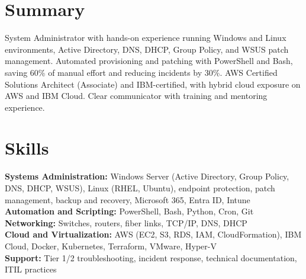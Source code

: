 \documentclass[a4paper,10pt]{article}
\begin{document}

\section*{Summary}
System Administrator with hands-on experience running Windows and Linux environments, Active Directory, DNS, DHCP, Group Policy, and WSUS patch management. Automated provisioning and patching with PowerShell and Bash, saving 60\% of manual effort and reducing incidents by 30\%. AWS Certified Solutions Architect (Associate) and IBM-certified, with hybrid cloud exposure on AWS and IBM Cloud. Clear communicator with training and mentoring experience.

\section*{Skills}
\textbf{Systems Administration:} Windows Server (Active Directory, Group Policy, DNS, DHCP, WSUS), Linux (RHEL, Ubuntu), endpoint protection, patch management, backup and recovery, Microsoft 365, Entra ID, Intune \\
\textbf{Automation and Scripting:} PowerShell, Bash, Python, Cron, Git\\
\textbf{Networking:} Switches, routers, fiber links, TCP/IP, DNS, DHCP\\
\textbf{Cloud and Virtualization:} AWS (EC2, S3, RDS, IAM, CloudFormation), IBM Cloud, Docker, Kubernetes, Terraform, VMware, Hyper-V \\
\textbf{Support:} Tier 1/2 troubleshooting, incident response, technical documentation, ITIL practices
\end{document}

